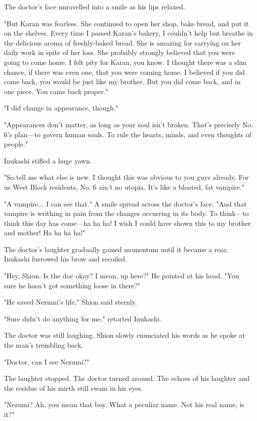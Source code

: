 The doctor's face unravelled into a smile as his lips relaxed.

"But Karan was fearless. She continued to open her shop, bake bread, and
put it on the shelves. Every time I passed Karan's bakery, I couldn't
help but breathe in the delicious aroma of freshly-baked bread. She is
amazing for carrying on her daily work in spite of her loss. She
probably strongly believed that you were going to come home. I felt pity
for Karan, you know. I thought there was a slim chance, if there was
even one, that you were coming home. I believed if you did come back,
you would be just like my brother. But you did come back, and in one
piece. You came back proper."

"I did change in appearance, though."

"Appearances don't matter, as long as your soul isn't broken. That's
precisely No. 6's plan---to govern human souls. To rule the hearts, minds,
and even thoughts of people."

Inukashi stifled a huge yawn.

"So tell me what else is new. I thought this was obvious to you guys
already. For us West Block residents, No. 6 ain't no utopia. It's like a
bloated, fat vampire."

"A vampire... I can see that." A smile spread across the doctor's face.
"And that vampire is writhing in pain from the changes occurring in its
body. To think---to think this day has come---ha ha ha! I wish I could have
shown this to my brother and mother! Ha ha ha ha!"

The doctor's laughter gradually gained momentum until it became a roar.
Inukashi furrowed his brow and recoiled.

"Hey, Shion. Is the doc okay? I mean, up here?" He pointed at his head.
"You sure he hasn't got something loose in there?"

"He saved Nezumi's life," Shion said sternly.

"Sure didn't do anything for me," retorted Inukashi.

The doctor was still laughing. Shion slowly enunciated his words as he
spoke at the man's trembling back.

"Doctor, can I see Nezumi?"

The laughter stopped. The doctor turned around. The echoes of his
laughter and the residue of his mirth still swam in his eyes.

"Nezumi? Ah, you mean that boy. What a peculiar name. Not his real name,
is it?"

